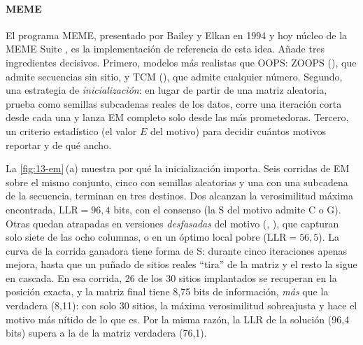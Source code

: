 \paragraph{MEME} El programa MEME, presentado por Bailey y Elkan en 1994 y hoy núcleo de la MEME Suite \parencite{c13-bailey2009}, es la implementación de referencia de esta idea. Añade tres ingredientes decisivos. Primero, modelos más realistas que OOPS: ZOOPS (), que admite secuencias sin sitio, y TCM (), que admite cualquier número. Segundo, una estrategia de \emph{inicialización}: en lugar de partir de una matriz aleatoria, prueba como semillas subcadenas reales de los datos, corre una iteración corta desde cada una y lanza EM completo solo desde las más prometedoras. Tercero, un criterio estadístico (el valor $E$ del motivo) para decidir cuántos motivos reportar y de qué ancho.

La \cref{fig:13-em}\,(a) muestra por qué la inicialización importa. Seis corridas de EM sobre el mismo conjunto, cinco con semillas aleatorias y una con una subcadena de la secuencia, terminan en tres destinos. Dos alcanzan la verosimilitud máxima encontrada, $\mathrm{LLR}=96{,}4$ bits, con el consenso  (la S del motivo admite C o G). Otras quedan atrapadas en versiones \emph{desfasadas} del motivo (, ), que capturan solo siete de las ocho columnas, o en un óptimo local pobre ($\mathrm{LLR}=56{,}5$). La curva de la corrida ganadora tiene forma de S: durante cinco iteraciones apenas mejora, hasta que un puñado de sitios reales ``tira'' de la matriz y el resto la sigue en cascada. En esa corrida, 26 de los 30 sitios implantados se recuperan en la posición exacta, y la matriz final tiene 8,75 bits de información, \emph{más} que la verdadera (8,11): con solo 30 sitios, la máxima verosimilitud sobreajusta y hace el motivo más nítido de lo que es. Por la misma razón, la $\mathrm{LLR}$ de la solución (96,4 bits) supera a la de la matriz verdadera (76,1).

